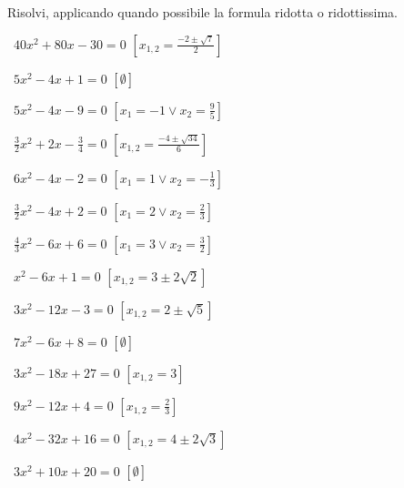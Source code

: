 \begin{esercizio}[\Ast]
\label{ese:3.21}
Risolvi, applicando quando possibile la formula ridotta o ridottissima.
\begin{multicols}{2}
 \begin{enumeratea}
 \item~$40 x^{2} + 80 x-30 = 0$
  \hfill$\left[x_{1,2} = \frac{- 2 \pm \sqrt{7}}{2}\right]$
 \item~$5 x^{2}-4 x + 1 = 0$
  \hfill$\left[\emptyset\right]$
 \item~$5 x^{2}-4 x-9 = 0$
  \hfill$\left[x_{1} =-1 \vee x_{2} = \frac{9}{5}\right]$
 \item~$\frac{3}{2} x^{2} + 2 x-\frac{3}{4} = 0$
  \hfill$\left[x_{1,2} = \frac{- 4 \pm \sqrt{34}}{6}\right]$
 \item~$6 x^{2}-4 x-2 = 0$
  \hfill$\left[x_{1} = 1 \vee x_{2} =-\frac{1}{3}\right]$
 \item~$\frac{3}{2} x^{2}-4 x + 2 = 0$
  \hfill$\left[x_{1} = 2 \vee x_{2} = \frac{2}{3}\right]$
 \item~$\frac{4}{3} x^{2}-6 x + 6 = 0$
  \hfill$\left[x_{1} = 3 \vee x_{2} = \frac{3}{2}\right]$
 \item~$x^{2}-6 x + 1 = 0$
  \hfill$\left[x_{1,2} = 3 \pm 2 \sqrt{2}\right]$
 \item~$3 x^{2}-12 x-3 = 0$
  \hfill$\left[x_{1,2} = 2 \pm \sqrt{5}\right]$
 \item~$7 x^{2}-6 x + 8 = 0$
  \hfill$\left[\emptyset\right]$
 \item~$3 x^{2}-18 x + 27 = 0$
  \hfill$\left[x_{1,2} =3\right]$
 \item~$9 x^{2}-12 x + 4 = 0$
  \hfill$\left[x_{1,2} = \frac{2}{3}\right]$
 \item~$4 x^{2}-32 x + 16 = 0$
  \hfill$\left[x_{1,2} = 4 \pm 2 \sqrt{3}\right]$
 \item~$3 x^{2} + 10 x + 20 = 0$
  \hfill$\left[\emptyset\right]$
 \end{enumeratea}
 \end{multicols}
\end{esercizio}


